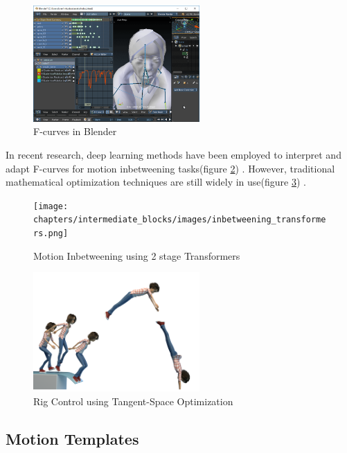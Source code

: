 \documentclass[../../main.tex]{subfiles}
\begin{document}
\begin{figure}
    \centering \includegraphics[width = 2.5in]{chapters/intermediate_blocks/images/fcurves_blender.png}
    \caption{F-curves in Blender}
    \label{fig:fcurves_blender}
\end{figure}

In recent research, deep learning methods have been employed to interpret and adapt F-curves for motion inbetweening tasks(figure \ref{fig:inbetweening_transformers}) \cite{10.1145/3550454.3555454}. However, traditional mathematical optimization techniques are still widely in use(figure \ref{fig:inbetweening_disney}) \cite{10.1145/3306346.3322938}.

\begin{figure}
    \centering \texttt{[image: chapters/intermediate\_blocks/images/inbetweening\_transformers.png]}
    \caption{Motion Inbetweening using 2 stage Transformers \cite{10.1145/3306346.3322938}}
    \label{fig:inbetweening_transformers}
\end{figure}

\begin{figure}
    \centering \includegraphics[width = 2.5in]{chapters/intermediate_blocks/images/inbetweening_disney.png}
    \caption{Rig Control using Tangent-Space Optimization}
    \label{fig:inbetweening_disney}
\end{figure}


\subsection{Motion Templates}
\label{ch:intermediate_blocks:related_work:motion_templates}
\end{document}
